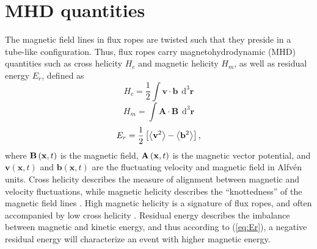 \section{MHD quantities}
The magnetic field lines in flux ropes are twisted such that they preside in a tube-like configuration. Thus, flux ropes carry magnetohydrodynamic (MHD) quantities such as cross helicity $H_c$ and magnetic helicity $H_m$, as well as residual energy $E_r$, defined as
\begin{equation}
    H_c = \frac{1}{2}\int \mathbf{v}\cdot\mathbf{b} \hspace{5pt} \mathrm{d^3} \mathbf{r}
    \label{eq:Hc}
\end{equation}
\begin{equation}
    H_m = \int \mathbf{A}\cdot\mathbf{B} \hspace{5pt} \mathrm{d^3} \mathbf{r}
    \label{eq:Hm}
\end{equation}
\begin{equation}
    E_r = \frac{1}{2} \left[ \left \langle \mathbf{v}^2 \right\rangle  - \left \langle \mathbf{b}^2 \right\rangle \right],
    \label{eq:Er}
\end{equation}
where $\mathbf{B}\left( \mathbf{x},t \right)$ is the magnetic field, $\mathbf{A}\left( \mathbf{x},t \right)$ is the magnetic vector potential, and $\mathbf{v}(\mathbf{x},t)$ and $\mathbf{b}(\mathbf{x},t)$ are the fluctuating velocity and magnetic field in Alfv\'en units. Cross helicity describes the measure of alignment between magnetic and velocity fluctuations, while magnetic helicity describes the “knottedness” of the magnetic field lines \citep{Matthaeus:1982}. High magnetic helicity is a signature of flux ropes, and often accompanied by low cross helicity \citep{Zhao:2020}. Residual energy describes the imbalance between magnetic and kinetic energy, and thus according to (\ref{eq:Er}), a negative residual energy will characterize an event with higher magnetic energy.

